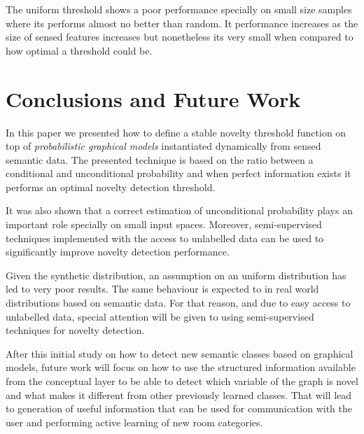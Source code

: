 \documentclass[runningheads,a4paper]{llncs}
\begin{document}
The uniform threshold shows a poor performance specially on small size samples
where its performs almost no better than random.
It performance increases as the size of sensed features increases but nonetheless
its very small when compared to how optimal a threshold could be.


\section{Conclusions and Future Work}
In this paper we presented how to define a stable novelty threshold function on
top of \emph{probabilistic graphical models} instantiated dynamically from sensed
semantic data.
The presented technique is based on the ratio between a conditional and
unconditional probability and when perfect information exists it performs an optimal
novelty detection threshold.

It was also shown that a correct estimation of unconditional probability plays an
important role specially on small input spaces. Moreover, semi-supervised techniques
implemented with the access to unlabelled data can be used to significantly improve
novelty detection performance.

Given the synthetic distribution, an assumption on an uniform
distribution has led to very poor results. The same behaviour is expected to
in real world distributions based on semantic data. For that reason,
and due to easy access to unlabelled data, special attention will be given to using
semi-supervised techniques for novelty detection.

After this initial study on how to detect new semantic classes based on
graphical models, future work will focus on how to use the structured
information available from the conceptual layer to be able to detect which variable
of the graph is novel and what makes it different from other previously learned
classes. That will lead to generation of useful information that can be used for
communication with the user and performing active learning of new room categories.




\end{document}

